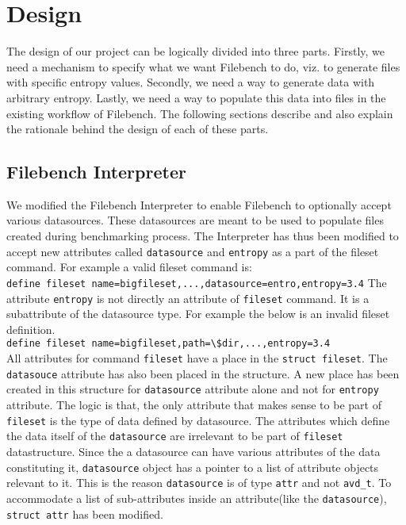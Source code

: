 \chapter{Design}\label{chap:des}
\noindent The design of our project can be logically divided into three parts. Firstly, we need a mechanism to specify what we want Filebench to do, viz. to generate files with specific entropy values. Secondly, we need a way to generate data with arbitrary entropy. Lastly, we need a way to populate this data into files in the existing workflow of Filebench. The following sections describe and also explain the rationale behind the design of each of these parts.

\section{Filebench Interpreter}
We modified the Filebench Interpreter to enable Filebench to optionally accept various datasources. These datasources are meant to be used to populate files created during benchmarking process. The Interpreter has thus been modified to accept new attributes called \verb+datasource+ and \verb+entropy+ as a part of the fileset command. For example a valid fileset command is:\\

\indent \verb+define fileset name=bigfileset,...,datasource=entro,entropy=3.4+
\newline
\noindent The attribute \verb+entropy+ is not directly an attribute of \verb+fileset+ command. It is a subattribute of the datasource type. For example the below is an invalid fileset definition.\\

\verb+define fileset name=bigfileset,path=\$dir,...,entropy=3.4+\\
\newline
\noindent All attributes for command \verb+fileset+ have a place in the \verb+struct fileset+. The \verb+datasouce+ attribute has also been placed in the structure. A new place has been created in this structure for \verb+datasource+ attribute alone and not for \verb+entropy+ attribute. The logic is that, the only attribute that makes sense to be part of \verb+fileset+ is the type of data defined by datasource. The attributes which define the data itself of the \verb+datasource+ are irrelevant to be part of \verb+fileset+ datastructure.
\newline
\noindent Since the a datasource can have various attributes of the data constituting it, \verb+datasource+ object has a pointer to a list of attribute objects relevant to it. This is the reason \verb+datasource+ is of type \verb+attr+ and not \verb+avd_t+. To accommodate  a list of sub-attributes inside an attribute(like the \verb+datasource+), \verb+struct attr+ has been modified.
